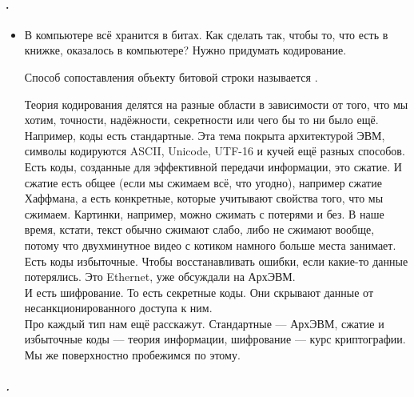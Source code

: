 \documentclass{article}
\begin{document}
    \paragraph{.}
    \begin{itemize}
        \item[]
        \begin{Comment}
            В компьютере всё хранится в битах. Как сделать так, чтобы то, что есть в книжке, оказалось в компьютере? Нужно придумать кодирование.
        \end{Comment}
        \dfn Способ сопоставления объекту битовой строки называется .
        \begin{Comment}
            Теория кодирования делятся на разные области в зависимости от того, что мы хотим, точности, надёжности, секретности или чего бы то ни было ещё.\\
            Например, коды есть стандартные. Эта тема покрыта архитектурой ЭВМ, символы кодируются ASCII, Unicode, UTF-16 и кучей ещё разных способов.\\
            Есть коды, созданные для эффективной передачи информации, это сжатие. И сжатие есть общее (если мы сжимаем всё, что угодно), например сжатие Хаффмана, а есть конкретные, которые учитывают свойства того, что мы сжимаем. Картинки, например, можно сжимать с потерями и без. В наше время, кстати, текст обычно сжимают слабо, либо не сжимают вообще, потому что двухминутное видео с котиком намного больше места занимает.\\
            Есть коды избыточные. Чтобы восстанавливать ошибки, если какие-то данные потерялись. Это Ethernet, уже обсуждали на АрхЭВМ.\\
            И есть шифрование. То есть секретные коды. Они скрывают данные от несанкционированного доступа к ним.\\
            Про каждый тип нам ещё расскажут. Стандартные --- АрхЭВМ, сжатие и избыточные коды --- теория информации, шифрование --- курс криптографии. Мы же поверхностно пробежимся по этому.
        \end{Comment}
    \end{itemize}
    \subparagraph{.}
\end{document}
